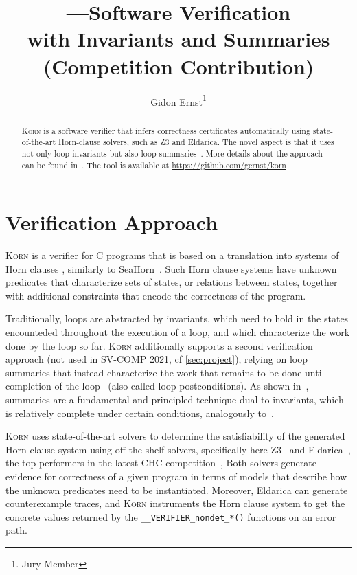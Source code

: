 \documentclass{llncs}
\author{Gidon Ernst\thanks{Jury Member}}
\title{\Korn---Software Verification \\ with Invariants and Summaries \\ (Competition Contribution)}
\institute{LMU Munich \\ \mailto{gidon.ernst@lmu.de}}
\newcommand{\Korn}{\textsc{Korn}\xspace}
\begin{document}
\maketitle

\begin{abstract}
    \Korn is a software verifier that infers correctness certificates automatically using state-of-the-art Horn-clause solvers, such as Z3 and Eldarica.
    The novel aspect is that it uses not only loop invariants but also loop summaries~\cite{hehner1999refinement,hehner2005specified,tuerk2010local}.
    More details about the approach can be found in~\cite{ernst:arxiv2020:summaries}.
    The tool is available at \url{https://github.com/gernst/korn}

\end{abstract}

\section{Verification Approach}
\label{sec:approach}

\Korn is a verifier for C programs that is based on a translation into systems of Horn clauses
\cite{bjorner2015horn,gurfinkel2019science}, similarly to SeaHorn~\cite{gurfinkel2015seahorn}.
Such Horn clause systems have unknown predicates that characterize sets of states,
or relations between states, together with additional constraints that encode the correctness of the program.

Traditionally, loops are abstracted by invariants, which need to hold in the states
encounteded throughout the execution of a loop, and which characterize the work done by the loop so far.
\Korn additionally supports a second verification approach (not used in SV-COMP 2021, cf \cref{sec:project}), relying on loop summaries that instead characterize
the work that remains to be done until completion of the loop~\cite{hehner1999refinement,tuerk2010local,hehner2005specified}
(also called loop postconditions).
As shown in~\cite{ernst:arxiv2020:summaries}, summaries are a fundamental and principled technique dual to invariants,
which is relatively complete under certain conditions, analogously to~\cite{hoare1969axiomatic}.

\Korn uses state-of-the-art solvers to determine the satisfiability of the generated Horn clause system
using off-the-shelf solvers, specifically here Z3~\cite{bjorner2013solving} and Eldarica~\cite{hojjat2018eldarica},
the top performers in the latest CHC competition~\cite{rummer2020competition},
Both solvers generate evidence for correctness of a given program in terms of models that describe how the unknown predicates need to be instantiated.
Moreover, Eldarica can generate counterexample traces, and \Korn instruments the Horn clause system to get
the concrete values returned by the \texttt{\_\_VERIFIER\_nondet\_*()} functions on an error path.
\end{document}
